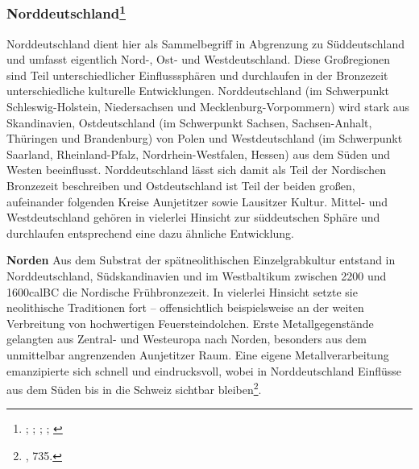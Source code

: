 \documentclass[openany,twoside,twocolumn]{book}
\let\rmarkdownfootnote\footnote%
\def\footnote{\protect\rmarkdownfootnote}
\begin{document}
\hypertarget{norddeutschland}{%
\subsubsection[Norddeutschland]{\texorpdfstring{Norddeutschland\footnote{\textcite{gorner_bestattungssitten_2002};
  \textcite{hofmann_rituelle_2008}; \textcite{jockenhovel_germany_2013};
  \textcite{jockenhovel_von_2003}; \textcite{schmidt_studien_1993}}}{Norddeutschland}}\label{norddeutschland}}

Norddeutschland dient hier als Sammelbegriff in Abgrenzung zu
Süddeutschland und umfasst eigentlich Nord-, Ost- und Westdeutschland.
Diese Großregionen sind Teil unterschiedlicher Einflusssphären und
durchlaufen in der Bronzezeit unterschiedliche kulturelle Entwicklungen.
Norddeutschland (im Schwerpunkt Schleswig-Holstein, Niedersachsen und
Mecklenburg-Vorpommern) wird stark aus Skandinavien, Ostdeutschland (im
Schwerpunkt Sachsen, Sachsen-Anhalt, Thüringen und Brandenburg) von
Polen und Westdeutschland (im Schwerpunkt Saarland, Rheinland-Pfalz,
Nordrhein-Westfalen, Hessen) aus dem Süden und Westen beeinflusst.
Norddeutschland lässt sich damit als Teil der Nordischen Bronzezeit
beschreiben und Ostdeutschland ist Teil der beiden großen, aufeinander
folgenden Kreise Aunjetitzer sowie Lausitzer Kultur. Mittel- und
Westdeutschland gehören in vielerlei Hinsicht zur süddeutschen Sphäre
und durchlaufen entsprechend eine dazu ähnliche Entwicklung.

\textbf{Norden} \newline  Aus dem Substrat der spätneolithischen
Einzelgrabkultur entstand in Norddeutschland, Südskandinavien und im
Westbaltikum zwischen 2200 und 1600calBC die Nordische Frühbronzezeit.
In vielerlei Hinsicht setzte sie neolithische Traditionen fort --
offensichtlich beispielsweise an der weiten Verbreitung von hochwertigen
Feuersteindolchen. Erste Metallgegenstände gelangten aus Zentral- und
Westeuropa nach Norden, besonders aus dem unmittelbar angrenzenden
Aunjetitzer Raum. Eine eigene Metallverarbeitung emanzipierte sich
schnell und eindrucksvoll, wobei in Norddeutschland Einflüsse aus dem
Süden bis in die Schweiz sichtbar bleiben\footnote{\textcite{jockenhovel_germany_2013},
  735.}.
\end{document}
